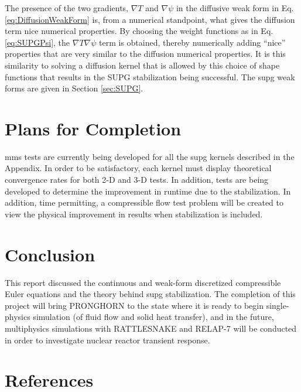 \documentclass[10pt]{article}
\numberwithin{equation}{section} %
\begin{document}
The presence of the two gradients, \(\nabla T\) and \(\nabla\psi\) in the diffusive weak form in Eq. \eqref{eq:DiffusionWeakForm} is, from a numerical standpoint, what gives the diffusion term nice numerical properties. By choosing the weight functions as in Eq. \eqref{eq:SUPGPsi}, the \(\nabla T\nabla\psi\) term is obtained, thereby numerically adding ``nice'' properties that are very similar to the diffusion numerical properties. It is this similarity to solving a diffusion kernel that is allowed by this choice of shape functions that results in the SUPG stabilization being successful. The \gls{supg} weak forms are given in Section \ref{sec:SUPG}.

\section{Plans for Completion}

\gls{mms} tests are currently being developed for all the \gls{supg} kernels described in the Appendix. In order to be satisfactory, each kernel must display theoretical convergence rates for both 2-D and 3-D tests. In addition, tests are being developed to determine the improvement in runtime due to the stabilization. In addition, time permitting, a compressible flow test problem will be created to view the physical improvement in results when stabilization is included.

\section{Conclusion}

This report discussed the continuous and weak-form discretized compressible Euler equations and the theory behind \gls{supg} stabilization. The completion of this project will bring PRONGHORN to the state where it is ready to begin single-physics simulation (of fluid flow and solid heat transfer), and in the future, multiphysics simulations with RATTLESNAKE and RELAP-7 will be conducted in order to investigate nuclear reactor transient response. 

\section{References}
\end{document}
